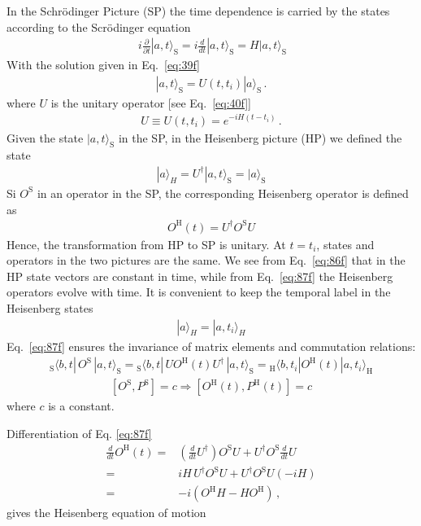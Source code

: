 In the Schr\"odinger Picture (SP) the time dependence is carried by the states according to the Scr\"odinger equation 
\begin{align}\
\label{eq:84f}
  i\frac{\partial}{\partial t}|a,t\rangle_{\text{S}}=  i\frac{d}{dt}|a,t\rangle_{\text{S}}=  {H}|a,t\rangle_{\text{S}}
\end{align}
With the solution given in Eq.~\eqref{eq:39f}
\begin{align}
\label{eq:85f}
    |a,t\rangle_{\text{S}}=U(t,t_i)|a\rangle_{\text{S}}\,.
\end{align}
where $U$ is the unitary operator [see Eq.~\eqref{eq:40f}]
\begin{align}
 U\equiv U(t,t_i)= e^{-i H(t-t_i)}\,.
\end{align}
Given the state $|a,t\rangle_{\text{S}}$ in the SP, in the Heisenberg picture (HP) we defined the state
\begin{align}
\label{eq:86f}
  |a\rangle_H=U^\dagger|a,t\rangle_{\text{S}}=|a\rangle_{\text{S}}
\end{align}
Si $O^{\text{S}}$ in an operator in the SP, the corresponding Heisenberg operator is defined as
\begin{align}
\label{eq:87f}
  O^{\text{H}}(t)=U^\dagger O^{\text{S}}U
\end{align}
Hence, the transformation from HP to SP is unitary. At $t=t_i$, states and operators in the two pictures are the same. We see from Eq.~\eqref{eq:86f} that in the HP state vectors are constant in time, while from Eq.~\eqref{eq:87f} the Heisenberg operators evolve with time. It is convenient to keep the temporal label in the Heisenberg states
\begin{align}
  |a\rangle_H=|a,t_i\rangle_H
\end{align}
Eq.~\eqref{eq:87f} ensures the invariance of matrix elements and commutation relations:
\begin{align}
  {}_{\text{S}}\langle b,t|\,O^{\text{S}}\,|a,t\rangle_{\text{S}}=  {}_{\text{S}}\langle b,t|\,U O^{\text{H}}(t) U^\dagger\,|a,t\rangle_{\text{S}}=
{}_{\text{H}}\langle b,t_i|O^{\text{H}}(t)|a,t_i\rangle_{\text{H}}
\end{align}
\begin{align}
\left[O^{\text{S}},P^{\text{S}}\right]=c\Rightarrow\left[O^{\text{H}}(t),P^{\text{H}}(t)\right]=c
\end{align}
where $c$ is a constant.

Differentiation of Eq. \eqref{eq:87f} 
\begin{align}
  \frac{d}{dt}O^{\text{H}}(t)=&\left(\frac{d}{dt}U^\dagger\right)O^{\text{S}}U+
U^\dagger O^{\text{S}}\frac{d}{dt}U\nonumber\\
 =&i H\, U^\dagger O^{\text{S}}U+
U^\dagger O^{\text{S}}U(-i H)\nonumber\\
 =&-i ( O^{\text{H}}H-H O^{\text{H}})\,,
\end{align}
gives the Heisenberg equation of motion

